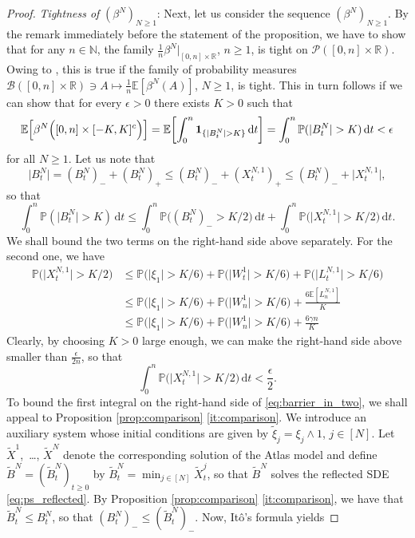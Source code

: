 \documentclass[11pt, a4paper]{article}
\theoremstyle{plain}
\theoremstyle{definition}
\theoremstyle{remark}
\numberwithin{equation}{section}
\newcommand{\ev}{\mathbb{E}}
\newcommand{\pr}{\mathbb{P}}
\newcommand{\R}{\mathbb{R}}
\renewcommand{\P}{\mathcal{P}}
\renewcommand{\d}{\mathrm{d}}
\newcommand{\bb}[1]{\mathbb{#1}}
\renewcommand{\bf}[1]{\mathbf{#1}}
\renewcommand{\cal}[1]{\mathcal{#1}}
\begin{document}
\begin{proof}
\textit{Tightness of} $(\beta^N)_{N \geq 1}$: Next, let us consider the sequence $(\beta^N)_{N \geq 1}$. By the remark immediately before the statement of the proposition, we have to show that for any $n \in \bb{N}$, the family $\frac{1}{n} \beta^N\vert_{[0, n] \times \R}$, $n \geq 1$, is tight on $\P([0, n] \times \R)$. Owing to \cite[Proposition 2.2(ii)]{sznitman_poc_1991}, this is true if the family of probability measures $\cal{B}([0, n] \times \R) \ni A \mapsto \frac{1}{n}\ev[\beta^N(A)]$, $N \geq 1$, is tight. This in turn follows if we can show that for every $\epsilon > 0$ there exists $K > 0$ such that 
\begin{equation*}
    \ev\Bigl[\beta^N\Bigl([0, n] \times [-K, K]^c\Bigr)\Bigr] = \ev\biggl[\int_0^n \bf{1}_{\{\lvert B^N_t\rvert > K\}} \, \d t\biggr] = \int_0^n \pr(\lvert B^N_t \rvert > K) \, \d t < \epsilon
\end{equation*}
for all $N \geq 1$. Let us note that
\begin{equation*}
    \lvert B^N_t\rvert = (B^N_t)_- + (B^N_t)_+ \leq (B^N_t)_- + (X^{N, 1}_t)_+ \leq (B^N_t)_- + \lvert X^{N, 1}_t\rvert,
\end{equation*}
so that
\begin{equation} \label{eq:barrier_in_two}
    \int_0^n \pr(\lvert B^N_t \rvert > K) \, \d t \leq \int_0^n \pr\bigl((B^N_t)_- > K/2\bigr) \, \d t + \int_0^n \pr\bigl(\lvert X^{N, 1}_t \rvert > K/2\bigr) \, \d t.
\end{equation}
We shall bound the two terms on the right-hand side above separately. For the second one, we have
\begin{align*}
    \pr\bigl(\lvert X^{N, 1}_t\rvert > K/2\bigr) &\leq \pr\bigl(\lvert \xi_1\rvert > K/6\bigr) + \pr\bigl(\lvert W^1_t\rvert > K/6\bigr) + \pr\bigl(\lvert L^{N, 1}_t\rvert > K/6\bigr) \\
    &\leq \pr\bigl(\lvert \xi_1\rvert > K/6\bigr) + \pr\bigl(\lvert W^1_n\rvert > K/6\bigr) + \frac{6\ev[L^{N, 1}_n]}{K} \\
    &\leq \pr\bigl(\lvert \xi_1\rvert > K/6\bigr) + \pr\bigl(\lvert W^1_n\rvert > K/6\bigr) + \frac{6 \gamma n}{K}
\end{align*}
Clearly, by choosing $K > 0$ large enough, we can make the right-hand side above smaller than $\frac{\epsilon}{2n}$, so that
\begin{equation} \label{eq:bound_on_second}
    \int_0^n \pr\bigl(\lvert X^{N, 1}_t \rvert > K/2\bigr) \, \d t < \frac{\epsilon}{2}.
\end{equation}
To bound the first integral on the right-hand side of \eqref{eq:barrier_in_two}, we shall appeal to Proposition \ref{prop:comparison} \ref{it:comparison}. We introduce an auxiliary system whose initial conditions are given by $\tilde{\xi}_j = \xi_j \land 1$, $j \in [N]$. Let $\tilde{X}^1$,~\ldots, $\tilde{X}^N$ denote the corresponding solution of the Atlas model and define $\tilde{B}^N = (\tilde{B}^N_t)_{t \geq 0}$ by $\tilde{B}^N_t = \min_{j \in [N]} \tilde{X}^j_t$, so that $\tilde{B}^N$ solves the reflected SDE \eqref{eq:ps_reflected}. By Proposition \ref{prop:comparison} \ref{it:comparison}, we have that $\tilde{B}^N_t \leq B^N_t$, so that $(B^N_t)_- \leq (\tilde{B}^N_t)_-$. Now, It\^o's formula yields

\end{proof}
\end{document}
